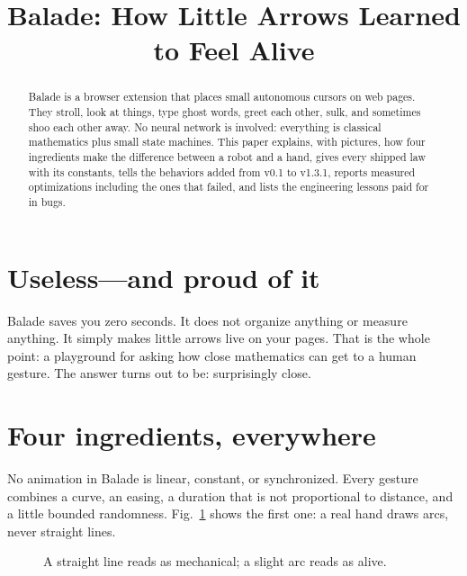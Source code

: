 \documentclass[10pt,conference]{IEEEtran}
\begin{document}
\title{Balade: How Little Arrows Learned to Feel Alive}
\author{}
\maketitle
\begin{abstract}
Balade is a browser extension that places small autonomous cursors on web
pages. They stroll, look at things, type ghost words, greet each other, sulk,
and sometimes shoo each other away. No neural network is involved: everything
is classical mathematics plus small state machines. This paper explains, with
pictures, how four ingredients make the difference between a robot and a hand,
gives every shipped law with its constants, tells the behaviors added from
v0.1 to v1.3.1, reports measured optimizations including the ones that failed,
and lists the engineering lessons paid for in bugs.
\end{abstract}

\section{Useless---and proud of it}
Balade saves you zero seconds. It does not organize anything or measure
anything. It simply makes little arrows live on your pages. That is the whole
point: a playground for asking how close mathematics can get to a human
gesture. The answer turns out to be: surprisingly close.

\section{Four ingredients, everywhere}
No animation in Balade is linear, constant, or synchronized. Every gesture
combines a curve, an easing, a duration that is not proportional to distance,
and a little bounded randomness. Fig.~\ref{fig:arc} shows the first one: a
real hand draws arcs, never straight lines.

\begin{figure}[h]
\centering
{}
\caption{A straight line reads as mechanical; a slight arc reads as alive.}
\label{fig:arc}
\end{figure}
\end{document}
